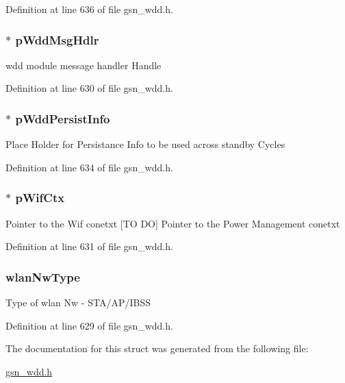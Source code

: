 Definition at line 636 of file gsn\_\-wdd.h.

\hypertarget{a00276_a6978c51a66d7b07a4fa1a13f9af82548}{
\subsubsection[{pWddMsgHdlr}]{$\ast$ {\bf pWddMsgHdlr}}}
\label{a00276_a6978c51a66d7b07a4fa1a13f9af82548}
wdd module message handler Handle 

Definition at line 630 of file gsn\_\-wdd.h.

\hypertarget{a00276_abe3cbdc445f6164df50177eecd227c8c}{
\subsubsection[{pWddPersistInfo}]{$\ast$ {\bf pWddPersistInfo}}}
\label{a00276_abe3cbdc445f6164df50177eecd227c8c}
Place Holder for Persistance Info to be used across standby Cycles 

Definition at line 634 of file gsn\_\-wdd.h.

\hypertarget{a00276_aa8e90d3c80ca98d22454e0840b8cf2d2}{
\subsubsection[{pWifCtx}]{$\ast$ {\bf pWifCtx}}}
\label{a00276_aa8e90d3c80ca98d22454e0840b8cf2d2}
Pointer to the Wif conetxt \mbox{[}TO DO\mbox{]} Pointer to the Power Management conetxt 

Definition at line 631 of file gsn\_\-wdd.h.

\hypertarget{a00276_a611759f3eaa5817846fb74212f7aaea5}{
\subsubsection[{wlanNwType}]{ {\bf wlanNwType}}}
\label{a00276_a611759f3eaa5817846fb74212f7aaea5}
Type of wlan Nw -\/ STA/AP/IBSS 

Definition at line 629 of file gsn\_\-wdd.h.



The documentation for this struct was generated from the following file:\begin{DoxyCompactItemize}
\item 
\hyperlink{a00603}{gsn\_\-wdd.h}\end{DoxyCompactItemize}
